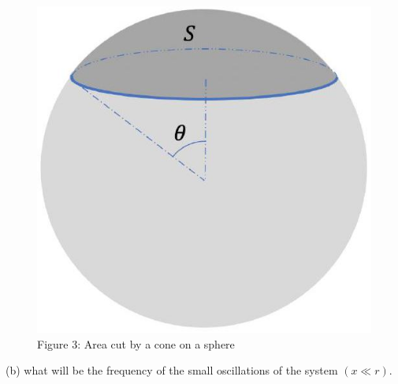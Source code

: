 \documentclass[10pt]{article}
\begin{document}
\begin{figure}[h]
\begin{center}
  \includegraphics[width=\textwidth]{2025_09_11_6312450c103d6a7e5736g-05}
\captionsetup{labelformat=empty}
\caption{Figure 3: Area cut by a cone on a sphere}
\end{center}
\end{figure}

(b) what will be the frequency of the small oscillations of the system $(x \ll r)$.
\end{document}
